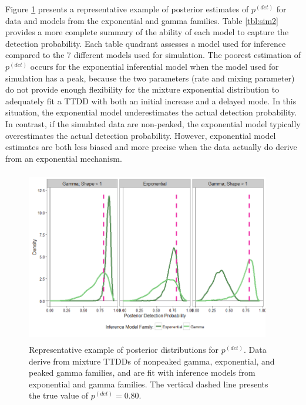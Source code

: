\documentclass[12pt]{article}
\newcommand{\pdet}{p^{(det)}}
\begin{document}
Figure \ref{fig:sim2typical} presents a representative example of posterior estimates of $\pdet$ for data and models from the exponential and gamma families.
Table \ref{tbl:sim2} provides a more complete summary of the ability of each model to capture the detection probability. 
Each table quadrant assesses a model used for inference compared to the 7 different models used for simulation. 
The poorest estimation of $\pdet$ occurs for the exponential inferential model when the model used for simulation has a peak, because the two parameters (rate and mixing parameter) do not provide enough flexibility for the mixture exponential distribution to adequately fit a TTDD with both an initial increase and a delayed mode. 
In this situation, the exponential model underestimates the actual detection probability.
In contrast, if the simulated data are non-peaked, the exponential model typically overestimates the actual detection probability. 
However, exponential model estimates are both less biased and more precise when the data actually do derive from an exponential mechanism.

\begin{figure}
\includegraphics[width=0.95\textwidth, height=3in]{"Oral Prelim/Posteriors_Families"}
\caption{\label{fig:sim2typical} Representative example of posterior distributions for $\pdet$.  Data derive from mixture TTDDs of nonpeaked gamma, exponential, and peaked gamma families, and are fit with inference models from exponential and gamma families.  The vertical dashed line presents the true value of $\pdet = 0.80$.}
\end{figure}
\end{document}
